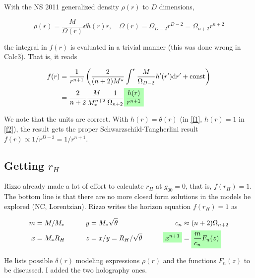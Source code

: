 \documentclass[10pt,a4paper, fleqn]{article}
\newcommand{\highlight}[1]{%
  \colorbox{green!30}{$\displaystyle#1$}}
\begin{document}
With the NS 2011 generalized density $\rho(r)$ to $D$ dimensions,

\begin{equation}
\rho(r) = \frac{M}{\Omega(r)} \dd{h(r)}{r}, \quad \Omega(r) = \Omega_{D-2} r^{D-2} = \Omega_{n+2} r^{n+2}
\end{equation}

the integral in $f(r)$ is evaluated in a trivial manner (this was done wrong in Calc3). That is, it reads

\begin{align}
f(r) &= \frac{1}{r^{n+1}} \left( \frac{2}{(n+2) M^\star} \int^r \frac{M}{\Omega_{D-2}} h'(r') \d{r'} + \text{const} \right) \label{f1} \\
&=\frac{2}{n+2} \frac{M}{M_*^{n+2}} \frac{1}{\Omega_{n+2}} \highlight{\frac{h(r)}{r^{n+1}} } \label{f2}
\end{align}

We note that the units are correct. With $h(r)=\theta(r)$ (in \ref{f1}, $h(r)=1$ in \ref{f2}), the result gets the proper Schwarzschild-Tangherlini result $f(r) \propto 1/r^{D-3} = 1/r^{n+1}$.

\newpage
\subsection{Getting $r_H$}

Rizzo already made a lot of effort to calculate $r_H$ at $g_{00}=0$, that is, $f(r_H)=1$. The bottom line is that there are no more closed form solutions in the models he explored (NC, Lorentzian). Rizzo writes the horizon equation $f(r_H)=1$ as

\begin{equation}
\begin{aligned}
m&=M/M_*      &\qquad y&=M_* \sqrt{\theta} &\qquad c_n&\approx (n+2)\Omega_{n+2}  \\
x&=M_* R_H    &\quad z&=x/y=R_H/\sqrt{\theta}   &\qquad \highlight{x^{n+1}} &= \highlight{\frac{m}{c_n} F_n(z)}
\end{aligned}
\end{equation}

He lists possible $\delta(r)$ modeling expressions $\rho(r)$ and the functions $F_n(z)$ to be discussed. I added the two holography ones.
\end{document}
